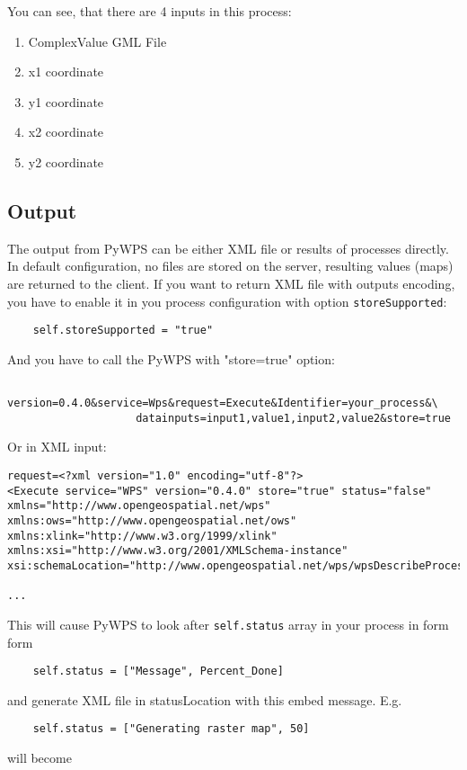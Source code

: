 \documentclass[a4paper,11pt]{article}
\begin{document}
    You can see, that there are 4 inputs in this process: 
     
    \begin{enumerate}
            \item ComplexValue GML File 
            \item x1 coordinate 
            \item y1 coordinate 
            \item x2 coordinate 
            \item y2 coordinate 
    \end{enumerate}
    \subsection{Output}
     
    The output from PyWPS can be either XML file or results of processes directly. In default configuration, no files are stored on the server, resulting values (maps) are 
    returned to the client. If you want to return XML file with outputs
    encoding, you have to enable it in you process configuration with
    option \texttt{storeSupported}:
     
    \begin{verbatim}
    self.storeSupported = "true"
    \end{verbatim}
     
    And you have to call the PyWPS with "store=true" option:
     
    \begin{verbatim}
    version=0.4.0&service=Wps&request=Execute&Identifier=your_process&\
                    datainputs=input1,value1,input2,value2&store=true
    \end{verbatim}
     
    Or in XML input:
     
    \begin{verbatim}
request=<?xml version="1.0" encoding="utf-8"?>
<Execute service="WPS" version="0.4.0" store="true" status="false"
xmlns="http://www.opengeospatial.net/wps"
xmlns:ows="http://www.opengeospatial.net/ows"
xmlns:xlink="http://www.w3.org/1999/xlink"
xmlns:xsi="http://www.w3.org/2001/XMLSchema-instance"
xsi:schemaLocation="http://www.opengeospatial.net/wps/wpsDescribeProcess.xsd">

...
    \end{verbatim}

    This will cause PyWPS to look after \texttt{self.status} array in your process in form form 
    \begin{verbatim}
    self.status = ["Message", Percent_Done]
    \end{verbatim}
    and generate XML file in statusLocation with this embed message. E.g.
    \begin{verbatim}
    self.status = ["Generating raster map", 50]
    \end{verbatim}
    will become
\end{document}
